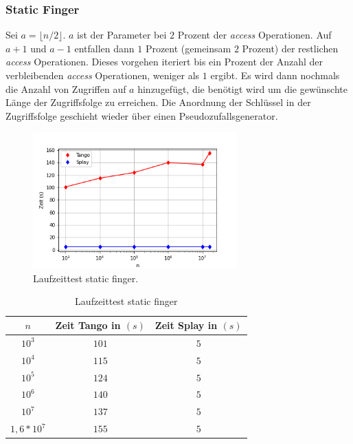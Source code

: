 \documentclass[a4paper,12pt]{article}
\begin{document}
\subsubsection{Static Finger}
Sei $a = \lfloor n / 2\rfloor$.  $a$ ist der Parameter bei $2$ Prozent der \textit{access} Operationen. Auf $a+1$ und $a-1$ entfallen dann $1$ Prozent (gemeinsam $2$ Prozent) der restlichen \textit{access} Operationen. Dieses vorgehen iteriert bis ein Prozent der Anzahl der verbleibenden \textit{access} Operationen, weniger als $1$ ergibt. Es wird dann nochmals die Anzahl von Zugriffen auf $a$ hinzugefügt, die benötigt wird um die gewünschte Länge der Zugriffsfolge zu erreichen.  Die Anordnung der Schlüssel in der Zugriffsfolge geschieht wieder über einen Pseudozufallsgenerator. 
\begin{figure}[H]
	\centering
	\includegraphics[width=0.7\textwidth]{"Medien/laufzeittest/diagramm/staticfinger"}
	\caption{Laufzeittest static finger.}
\end{figure}
\begin{table}[H]
	\begin{center}
		\begin{tabular}[c]{|c|c|c|}
			\hline
			$n$ & Zeit Tango in $\left(s\right)$ &Zeit Splay in $\left(s\right)$ \\
			\hline
			$10^3$ & $101$ &$5$ \\
			\hline
			$10^4$  & $115$ &$5$  \\
			\hline
			$10^5$  & $124$ &$5$  \\
			\hline
			$10^6$  & $140$ &$5$  \\
			\hline
			$10^7$  & $137$ &$5$  \\
			\hline
			$1,6 *10^7$  & $155$ &$5$  \\
			\hline
		\end{tabular}
		\caption{Laufzeittest static finger} 
	\end{center}
\end{table}
\end{document}
